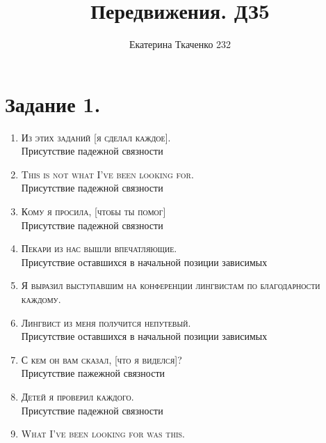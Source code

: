 \documentclass[14pt,extrafontsizes]{article}
\title{Передвижения. ДЗ5}
\author{Екатерина Ткаченко 232}
\begin{document}
\maketitle
\section*{Задание 1.}
\begin{enumerate}
    \item \textsc{Из этих заданий [я сделал каждое].}\\
        Присутствие падежной связности
    \item \textsc{This is not what I’ve been looking for.}\\
        Присутствие падежной связности
    \item \textsc{Кому я просила, [чтобы ты помог]}\\
    Присутствие падежной связности
    \item \textsc{Пекари из нас вышли впечатляющие.}\\
    Присутствие оставшихся в начальной позиции зависимых
    \item \textsc{Я выразил выступавшим на конференции лингвистам по благодарности каждому.}\\
    \item \textsc{Лингвист из меня получится непутевый.}\\
        Присутствие оставшихся в начальной позиции зависимых
    \item \textsc{С кем он вам сказал, [что я виделся]?}\\ 
    Присутствие пажежной связности
    \item \textsc{Детей я проверил каждого.}\\
        Присутствие падежной связности
    \item \textsc{What I’ve been looking for was this.}\\
\end{enumerate}
\end{document}
